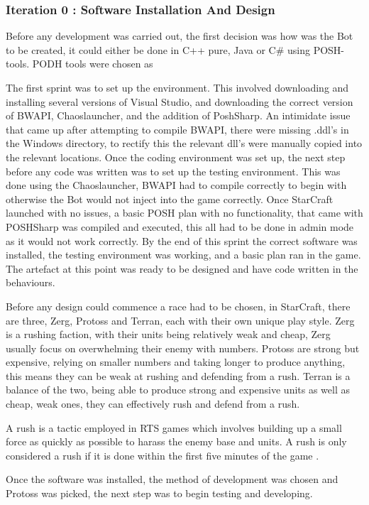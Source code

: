 \documentclass[journal]{IEEEtran}
\begin{document}
\subsubsection{Iteration 0 : Software Installation And Design}
Before any development was carried out, the first decision was how was the Bot to be created, it could either be done in C++ pure, Java or C\# using POSH-tools. PODH tools were chosen as
 
The first sprint was to set up the environment. This involved downloading and installing several versions of Visual Studio, and downloading the correct version of BWAPI, Chaoslauncher, and the addition of PoshSharp. An intimidate issue that came up after attempting to compile BWAPI, there were missing .ddl's in the Windows directory, to rectify this the relevant dll's were manually copied into the relevant locations. Once the coding environment was set up, the next step before any code was written was to set up the testing environment. This was done using the Chaoslauncher, BWAPI had to compile correctly to begin with otherwise the Bot would not inject into the game correctly. Once StarCraft launched with no issues, a basic POSH plan with no functionality, that came with POSHSharp was compiled and executed, this all had to be done in admin mode as it would not work correctly. By the end of this sprint the correct software was installed, the testing environment was working, and a basic plan ran in the game. The artefact at this point was ready to be designed and have code written in the behaviours.

Before any design could commence a race had to be chosen, in StarCraft, there are three, Zerg, Protoss and Terran, each with their own unique play style. Zerg is a rushing faction, with their units being relatively weak and cheap, Zerg usually focus on overwhelming their enemy with numbers. Protoss are strong but expensive, relying on smaller numbers and taking longer to produce anything, this means they can be weak at rushing and defending from a rush. Terran is a balance of the two, being able to produce strong and expensive units as well as cheap, weak ones, they can effectively rush and defend from a rush.

A rush is a tactic employed in RTS games which involves building up a small force as quickly as possible to harass the enemy base and units. A rush is only considered a rush if it is done within the first five minutes of the game \cite{Liqui}.

Once the software was installed, the method of development was chosen and Protoss was picked, the next step was to begin testing and developing. 
\newline
\end{document}
